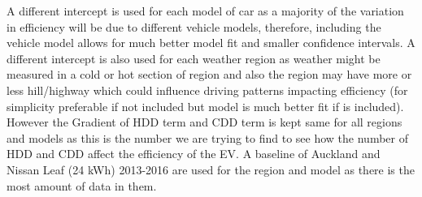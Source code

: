 \documentclass[
]{article}
\begin{document}
A different intercept is used for each model of car as a majority of the
variation in efficiency will be due to different vehicle models,
therefore, including the vehicle model allows for much better model fit
and smaller confidence intervals. A different intercept is also used for
each weather region as weather might be measured in a cold or hot
section of region and also the region may have more or less hill/highway
which could influence driving patterns impacting efficiency (for
simplicity preferable if not included but model is much better fit if is
included). However the Gradient of HDD term and CDD term is kept same
for all regions and models as this is the number we are trying to find
to see how the number of HDD and CDD affect the efficiency of the EV. A
baseline of Auckland and Nissan Leaf (24 kWh) 2013-2016 are used for the
region and model as there is the most amount of data in them.
\end{document}
